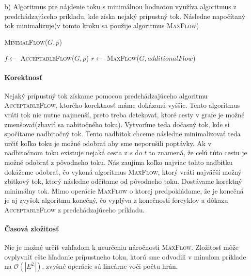 \documentclass[12pt]{iv003}
\begin{document}
b) Algoritmus pre nájdenie toku s minimálnou hodnotou využíva algoritmus z predchádzajúceho príkladu, kde získa nejaký prípustný tok. Následne napočítaný tok minimalizuje(v tomto kroku sa použije algoritmus \textsc{MaxFlow})

\begin{algorithm}[H]
	\caption{\textsc{MinimalFlow}($G, p$)}
	$f \leftarrow$ \textsc{AcceptableFlow($G,p$)}\;
	$r \leftarrow$ \textsc{MaxFlow($G, additionalFlow$)}\;
\end{algorithm}

\paragraph{Korektnosť} Nejaký prípustný tok získame pomocou predchádzajúceho algoritmu \textsc{AcceptableFlow}, ktorého korektnosť máme dokázanú vyššie. Tento algoritmus vráti tok nie nutne najmenší, preto treba detekovať, ktoré cesty v grafe je možné zmenšovať(zbaviť sa nabitočného toku). Vytvoríme teda dočasný tok, kde si spočítame nadbitočný tok. Tento nadbitok chceme následne minimalizovať teda určiť koľko toku je možné odobrať aby sme neporušili poptávky. Ak v nadbitočnom toku existuje nejaká cesta z $s$ do $t$ to znamená, že celú túto cestu je možné odobrať z pôvodneho toku. Nás zaujíma koľko najviac tohto nadbitku dokážeme odobrať, čo vykoná algoritmus \textsc{MaxFlow}, ktorý vráti najväčší možný zbitkový tok, ktorý následne odčítame od pôvodneho toku. Dostávame korektný minimálny tok. Mimo operácie \textsc{MaxFlow} o ktorej predpokládame, že je konečná je aj zvyšok algoritmu konečný, čo vyplýva z konečnosti forcyklov a dôkazu \textsc{AcceptableFlow} z predchádzajúceho príkladu.

\paragraph{Časová zložitosť} Nie je možné určiť vzhľadom k neurčeniu náročnosti \textsc{MaxFlow}. Zložitosť môže ovplyvniť ešte hľadanie  prípustneho toku, ktorú sme odvodili v minulom príklade na $\mathcal{O}(|E^{2}|)$, zvyšné operácie sú lineárne voči počtu hrán.
\end{document}
